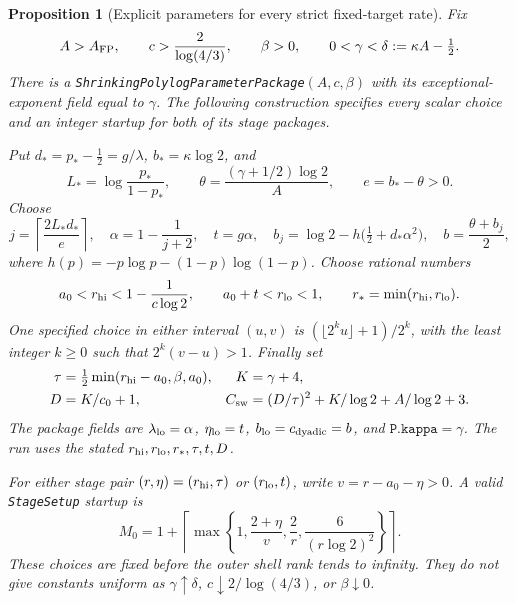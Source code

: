 \documentclass[11pt]{article}
\newtheorem{proposition}{Proposition}
\theoremstyle{remark}\newtheorem{remark}[proposition]{Remark}
\begin{document}
\begin{proposition}[Explicit parameters for every strict fixed-target rate]
\label{prop:shaik-prescribed-rate}
Fix
\[
 A>A_{\rm FP},\qquad c>\frac{2}{\log(4/3)},\qquad \beta>0,\qquad
 0<\gamma<\delta:=\kappa A-\tfrac12.
\]
There is a \texttt{ShrinkingPolylogParameterPackage}\((A,c,\beta)\)
with its exceptional-exponent field equal to \(\gamma\).
The following construction specifies every scalar choice and an
integer startup for both of its stage packages.

Put \(d_*=p_*-\tfrac12=g/\lambda\),
\(b_*=\kappa\log2\), and
\[
 L_*=\log\frac{p_*}{1-p_*},\qquad
 \theta=\frac{(\gamma+1/2)\log2}{A},\qquad e=b_*-\theta>0.
\]
Choose
\begin{equation}\label{eq:shaik-effective-barrier}
 j=\left\lceil\frac{2L_*d_*}{e}\right\rceil,\quad
 \alpha=1-\frac1{j+2},\quad t=g\alpha,\quad
 b_j=\log2-h\bigl(\tfrac12+d_*\alpha^2\bigr),\quad
 b=\frac{\theta+b_j}{2},
\end{equation}
where \(h(p)=-p\log p-(1-p)\log(1-p)\).
Choose rational numbers
\[
 a_0<r_{\rm hi}<1-\frac1{c\log2},\qquad
 a_0+t<r_{\rm lo}<1,\qquad r_*=\min(r_{\rm hi},r_{\rm lo}).
\]
One specified choice in either interval \((u,v)\) is
\((\lfloor2^k u\rfloor+1)/2^k\), with the least integer \(k\ge0\)
such that \(2^k(v-u)>1\).
Finally set
\begin{equation}\label{eq:shaik-prescribed-high}
 \begin{aligned}
 \tau&=\tfrac12\min(r_{\rm hi}-a_0,\beta,a_0),&
 K&=\gamma+4,\\
 D&=K/c_0+1,&
 C_{\rm sw}&=(D/\tau)^2+K/\log2+A/\log2+3 .
 \end{aligned}
\end{equation}
The package fields are
\(\lambda_{\rm lo}=\alpha\), \(\eta_{\rm lo}=t\),
\(b_{\rm lo}=c_{\rm dyadic}=b\), and
\(\texttt{P.kappa}=\gamma\).
The run uses the stated \(r_{\rm hi},r_{\rm lo},r_*,\tau,t,D\).

For either stage pair \((r,\eta)=(r_{\rm hi},\tau)\) or
\((r_{\rm lo},t)\), write \(v=r-a_0-\eta>0\).
A valid \texttt{StageSetup} startup is
\begin{equation}\label{eq:shaik-explicit-startup}
 M_0=1+\left\lceil\max\left\{
 1,\frac{2+\eta}{v},\frac2r,\frac6{(r\log2)^2}
 \right\}\right\rceil .
\end{equation}
These choices are fixed before the outer shell rank tends to infinity.
They do not give constants uniform as \(\gamma\uparrow\delta\),
\(c\downarrow2/\log(4/3)\), or \(\beta\downarrow0\).
\end{proposition}
\end{document}
